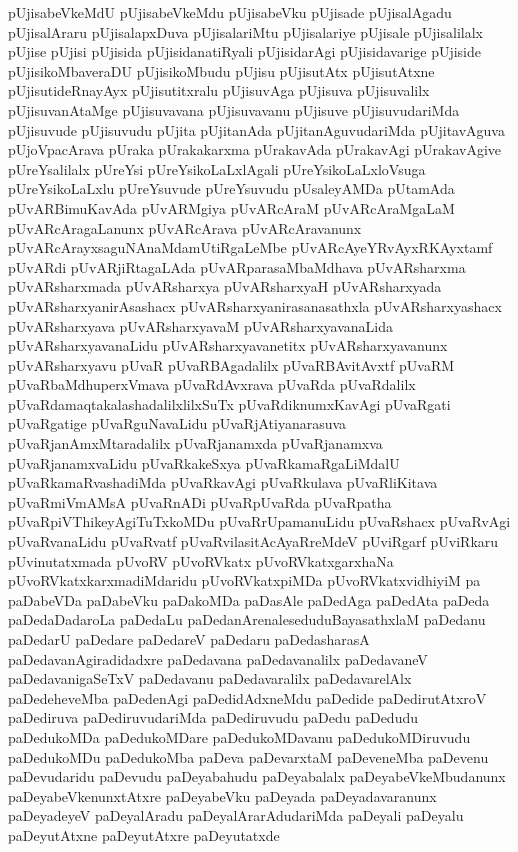 {pUjisabeVkeMdU
pUjisabeVkeMdu
pUjisabeVku
pUjisade
pUjisalAgadu
pUjisalAraru
pUjisalapxDuva
pUjisalariMtu
pUjisalariye
pUjisale
pUjisalilalx
pUjise
pUjisi
pUjisida
pUjisidanatiRyali
pUjisidarAgi
pUjisidavarige
pUjiside
pUjisikoMbaveraDU
pUjisikoMbudu
pUjisu
pUjisutAtx
pUjisutAtxne
pUjisutideRnayAyx
pUjisutitxralu
pUjisuvAga
pUjisuva
pUjisuvalilx
pUjisuvanAtaMge
pUjisuvavana
pUjisuvavanu
pUjisuve
pUjisuvudariMda
pUjisuvude
pUjisuvudu
pUjita
pUjitanAda
pUjitanAguvudariMda
pUjitavAguva
pUjoVpacArava
pUraka
pUrakakarxma
pUrakavAda
pUrakavAgi
pUrakavAgive
pUreYsalilalx
pUreYsi
pUreYsikoLaLxlAgali
pUreYsikoLaLxloVsuga
pUreYsikoLaLxlu
pUreYsuvude
pUreYsuvudu
pUsaleyAMDa
pUtamAda
pUvARBimuKavAda
pUvARMgiya
pUvARcAraM
pUvARcAraMgaLaM
pUvARcAragaLanunx
pUvARcArava
pUvARcAravanunx
pUvARcArayxsaguNAnaMdamUtiRgaLeMbe
pUvARcAyeYRvAyxRKAyxtamf
pUvARdi
pUvARjiRtagaLAda
pUvARparasaMbaMdhava
pUvARsharxma
pUvARsharxmada
pUvARsharxya
pUvARsharxyaH
pUvARsharxyada
pUvARsharxyanirAsashacx
pUvARsharxyanirasanasathxla
pUvARsharxyashacx
pUvARsharxyava
pUvARsharxyavaM
pUvARsharxyavanaLida
pUvARsharxyavanaLidu
pUvARsharxyavanetitx
pUvARsharxyavanunx
pUvARsharxyavu
pUvaR
pUvaRBAgadalilx
pUvaRBAvitAvxtf
pUvaRM
pUvaRbaMdhuperxVmava
pUvaRdAvxrava
pUvaRda
pUvaRdalilx
pUvaRdamaqtakalashadalilxlilxSuTx
pUvaRdiknumxKavAgi
pUvaRgati
pUvaRgatige
pUvaRguNavaLidu
pUvaRjAtiyanarasuva
pUvaRjanAmxMtaradalilx
pUvaRjanamxda
pUvaRjanamxva
pUvaRjanamxvaLidu
pUvaRkakeSxya
pUvaRkamaRgaLiMdalU
pUvaRkamaRvashadiMda
pUvaRkavAgi
pUvaRkulava
pUvaRliKitava
pUvaRmiVmAMsA
pUvaRnADi
pUvaRpUvaRda
pUvaRpatha
pUvaRpiVThikeyAgiTuTxkoMDu
pUvaRrUpamanuLidu
pUvaRshacx
pUvaRvAgi
pUvaRvanaLidu
pUvaRvatf
pUvaRvilasitAcAyaRreMdeV
pUviRgarf
pUviRkaru
pUvinutatxmada
pUvoRV
pUvoRVkatx
pUvoRVkatxgarxhaNa
pUvoRVkatxkarxmadiMdaridu
pUvoRVkatxpiMDa
pUvoRVkatxvidhiyiM
pa
paDabeVDa
paDabeVku
paDakoMDa
paDasAle
paDedAga
paDedAta
paDeda
paDedaDadaroLa
paDedaLu
paDedanArenaleseduduBayasathxlaM
paDedanu
paDedarU
paDedare
paDedareV
paDedaru
paDedasharasA
paDedavanAgiradidadxre
paDedavana
paDedavanalilx
paDedavaneV
paDedavanigaSeTxV
paDedavanu
paDedavaralilx
paDedavarelAlx
paDedeheveMba
paDedenAgi
paDedidAdxneMdu
paDedide
paDedirutAtxroV
paDediruva
paDediruvudariMda
paDediruvudu
paDedu
paDedudu
paDedukoMDa
paDedukoMDare
paDedukoMDavanu
paDedukoMDiruvudu
paDedukoMDu
paDedukoMba
paDeva
paDevarxtaM
paDeveneMba
paDevenu
paDevudaridu
paDevudu
paDeyabahudu
paDeyabalalx
paDeyabeVkeMbudanunx
paDeyabeVkenunxtAtxre
paDeyabeVku
paDeyada
paDeyadavaranunx
paDeyadeyeV
paDeyalAradu
paDeyalArarAdudariMda
paDeyali
paDeyalu
paDeyutAtxne
paDeyutAtxre
paDeyutatxde
}
